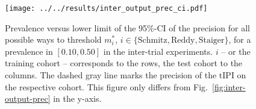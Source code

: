 \begin{figure}
    \centering
    \texttt{[image: ../../results/inter\_output\_prec\_ci.pdf]}
    \caption{Prevalence versus lower limit of the \num{95}\%-CI of the precision for all possible 
        ways to threshold $m^*_i$, $i \in \{ \text{Schmitz}, \text{Reddy}, \text{Staiger} \}$, for 
        a prevalence in $[\num{0.10}, \num{0.50}]$ in 
        the inter-trial experiments. $i$ -- or the training cohort -- corresponds to the rows, the 
        test cohort to the columns. The dashed gray 
        line marks the precision of the $\text{tIPI}$ on the respective cohort. This figure only 
        differs from Fig.\ \ref{fig:inter-output-prec} in the y-axis.}
    \label{fig:inter-output-prec-ci}
\end{figure}